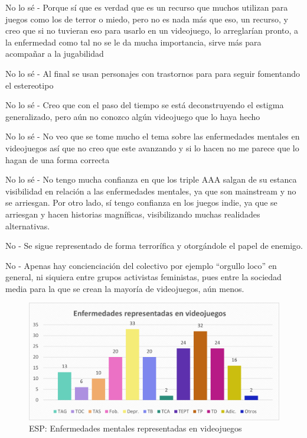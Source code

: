 \documentclass[12pt, a4paper,twoside,titlepage]{book}
\begin{document}
\begin{enumerate}[label=\textbf{\arabic*}.]
        No lo sé - Porque sí que es verdad que es un recurso que muchos utilizan para juegos como los de terror o miedo, pero no es nada más que eso, un recurso, y creo que si no tuvieran eso para usarlo en un videojuego, lo arreglarían pronto, a la enfermedad como tal no se le da mucha importancia, sirve más para acompañar a la jugabilidad
        
        No lo sé - Al final se usan personajes con trastornos para para seguir fomentando el estereotipo
        
        No lo sé - Creo que con el paso del tiempo se está deconstruyendo el estigma generalizado, pero aún no conozco algún videojuego que lo haya hecho
        
        No lo sé - No veo que se tome mucho el tema sobre las enfermedades mentales en videojuegos así que no creo que este avanzando y si lo hacen no me parece que lo hagan de una forma correcta
        
        No lo sé - No tengo mucha confianza en que los triple AAA salgan de su estanca visibilidad en relación a las enfermedades mentales, ya que son mainstream y no se arriesgan. Por otro lado, sí tengo confianza en los juegos indie, ya que se arriesgan y hacen historias magníficas, visibilizando muchas realidades alternativas.
        
        No - Se sigue representado de forma terrorífica y otorgándole el papel de enemigo.
        
        No - Apenas hay concienciación del colectivo por ejemplo ``orgullo loco'' en general, ni siquiera entre grupos activistas feministas, pues entre la sociedad media para la que se crean la mayoría de videojuegos, aún menos.
        
        
\end{enumerate}



\begin{figure}
    \centering
    \includegraphics[width=.8\linewidth]{ANEXO ESP/14AnexESPEnfvid}
    \caption{ESP: Enfermedades mentales representadas en videojuegos}
    \label{fig:ESPEnfvid}
\end{figure}
\end{document}
